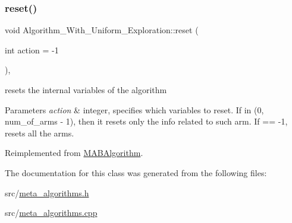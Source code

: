 \subsubsection{\texorpdfstring{reset()}{reset()}}
{\footnotesize\ttfamily void Algorithm\+\_\+\+With\+\_\+\+Uniform\+\_\+\+Exploration\+::reset (\begin{DoxyParamCaption}\item[{int}]{action = {\ttfamily -\/1} }\end{DoxyParamCaption})\hspace{0.3cm}{\ttfamily [override]}, {\ttfamily [virtual]}}



resets the internal variables of the algorithm 


\begin{DoxyParams}{Parameters}
{\em action} & integer, specifies which variables to reset. If in (0, num\+\_\+of\+\_\+arms -\/ 1), then it resets only the info related to such arm. If == -\/1, resets all the arms. \\
\hline
\end{DoxyParams}


Reimplemented from \mbox{\hyperlink{class_m_a_b_algorithm_ad5761cee0b0e3421d1f043dbcc0b5f85}{M\+A\+B\+Algorithm}}.



The documentation for this class was generated from the following files\+:\begin{DoxyCompactItemize}
\item 
src/\mbox{\hyperlink{meta__algorithms_8h}{meta\+\_\+algorithms.\+h}}\item 
src/\mbox{\hyperlink{meta__algorithms_8cpp}{meta\+\_\+algorithms.\+cpp}}\end{DoxyCompactItemize}

